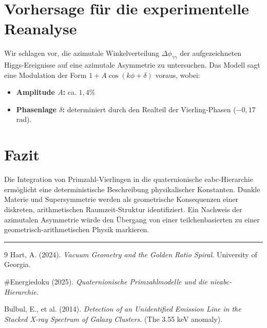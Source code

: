 \documentclass[12pt,a4paper]{article}
\begin{document}
	\section{Vorhersage für die experimentelle Reanalyse}
	Wir schlagen vor, die azimutale Winkelverteilung $\Delta\phi_{\gamma\gamma}$ der aufgezeichneten Higgs-Ereignisse auf eine azimutale Asymmetrie zu untersuchen. Das Modell sagt eine Modulation der Form $1 + A \cos(k\phi + \delta)$ voraus, wobei:
	\begin{itemize}
		\item \textbf{Amplitude $A$:} ca. $1{,}4\%$
		\item \textbf{Phasenlage $\delta$:} determiniert durch den Realteil der Vierling-Phasen ($-0{,}17$ rad).
	\end{itemize}
	
	\section{Fazit}
	Die Integration von Primzahl-Vierlingen in die quaternionische eabc-Hierarchie ermöglicht eine deterministische Beschreibung physikalischer Konstanten. Dunkle Materie und Supersymmetrie werden als geometrische Konsequenzen einer diskreten, arithmetischen Raumzeit-Struktur identifiziert. Ein Nachweis der azimutalen Asymmetrie würde den Übergang von einer teilchenbasierten zu einer geometrisch-arithmetischen Physik markieren.
	
	\vspace{1em}
	\hrule
	\vspace{1em}
	
	\begin{thebibliography}{9}
		Hart, A. (2024). \textit{Vacuum Geometry and the Golden Ratio Spiral.} University of Georgia.
		
		\#Energiedoku (2025). \textit{Quaternionische Primzahlmodelle und die nieabc-Hierarchie.}
		
		Bulbul, E., et al. (2014). \textit{Detection of an Unidentified Emission Line in the Stacked X-ray Spectrum of Galaxy Clusters.} (The 3.55 keV anomaly).
	\end{thebibliography}
	
	
	
\end{document}

